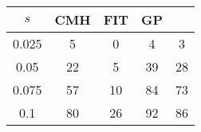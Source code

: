 \centering \begin{tabular}{c|c|c|c|c}
$s$	&CMH	&FIT	&GP	&\sc{Clear}\\\hline
0.025	&5	&0	&4	&3\\
0.05	&22	&5	&39	&28\\
0.075	&57	&10	&84	&73\\
0.1	&80	&26	&92	&86\\
\end{tabular}
